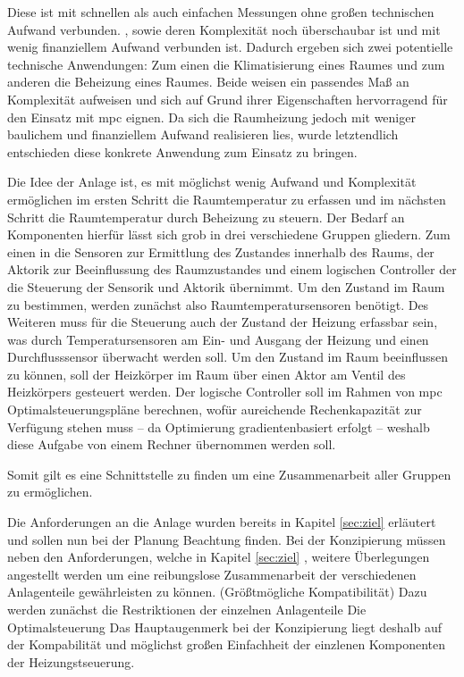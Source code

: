 Diese ist mit schnellen als auch einfachen Messungen ohne großen technischen Aufwand verbunden.
, sowie deren Komplexität noch überschaubar ist und mit wenig finanziellem Aufwand verbunden ist. Dadurch ergeben sich zwei potentielle technische Anwendungen: Zum einen die Klimatisierung eines Raumes und zum anderen die Beheizung eines Raumes. Beide weisen ein passendes Maß an Komplexität aufweisen und sich auf Grund ihrer Eigenschaften hervorragend für den Einsatz mit \acrlong{mpc} eignen. Da sich die Raumheizung jedoch mit weniger baulichem und finanziellem Aufwand realisieren lies, wurde letztendlich entschieden diese konkrete Anwendung zum Einsatz zu bringen.


Die Idee der Anlage ist, es mit möglichst wenig Aufwand und Komplexität ermöglichen im ersten Schritt die Raumtemperatur zu erfassen und im nächsten Schritt die Raumtemperatur durch Beheizung zu steuern. Der Bedarf an Komponenten hierfür lässt sich grob in drei verschiedene Gruppen gliedern. Zum einen in die Sensoren zur Ermittlung des Zustandes innerhalb des Raums, der Aktorik zur Beeinflussung des Raumzustandes und einem logischen Controller der die Steuerung der Sensorik und Aktorik übernimmt.
Um den Zustand im Raum zu bestimmen, werden zunächst also Raumtemperatursensoren benötigt. Des Weiteren muss für die Steuerung auch der Zustand der Heizung erfassbar sein, was durch Temperatursensoren am Ein- und Ausgang der Heizung und einen Durchflusssensor überwacht werden soll.
Um den Zustand im Raum beeinflussen zu können, soll der Heizkörper im Raum über einen Aktor am Ventil des Heizkörpers gesteuert werden.
Der logische Controller soll im Rahmen von \acrlong{mpc} Optimalsteuerungspläne berechnen, wofür aureichende Rechenkapazität zur Verfügung stehen muss -- da Optimierung gradientenbasiert erfolgt -- weshalb diese Aufgabe von einem Rechner übernommen werden soll.

Somit gilt es eine Schnittstelle zu finden um eine Zusammenarbeit aller Gruppen zu ermöglichen.

Die Anforderungen an die Anlage wurden bereits in Kapitel \ref{sec:ziel} erläutert und sollen nun bei der Planung Beachtung finden.
Bei der Konzipierung müssen neben den Anforderungen, welche in Kapitel \ref{sec:ziel} , weitere Überlegungen angestellt werden um eine reibungslose Zusammenarbeit der verschiedenen Anlagenteile gewährleisten zu können. (Größtmögliche Kompatibilität)
Dazu werden zunächst die Restriktionen der einzelnen Anlagenteile
Die Optimalsteuerung 
Das Hauptaugenmerk bei der Konzipierung liegt deshalb auf der Kompabilität und möglichst großen Einfachheit der einzlenen Komponenten der Heizungstseuerung. 


